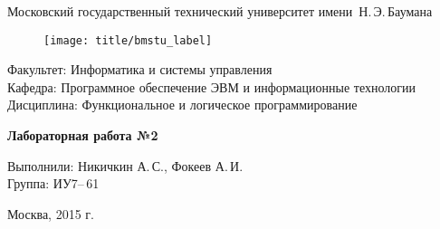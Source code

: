 
\thispagestyle{empty}

\begin{center}
	\Large
	Московский государственный технический университет имени~Н.\,Э.\,Баумана
\end{center}

\begin{figure}[h!]
	\begin{center}
		\texttt{[image: title/bmstu\_label]}
	\end{center}
\end{figure}

{\large
\noindent
Факультет: Информатика и системы управления\\[2mm]
\noindent
Кафедра: Программное обеспечение ЭВМ и информационные технологии\\[2mm]
\noindent
Дисциплина: Функциональное и логическое программирование
\vspace{1.5cm}}

\begin{center}
	\Large
	\textbf{Лабораторная работа №2}
\end{center}
\vfill

\hfill\begin{minipage}{0.5\textwidth}
	Выполнили: Никичкин А.\,С., Фокеев А.\,И.\\
	Группа: ИУ7--\,61
\end{minipage}
\vfill

\begin{center}
	Москва, 2015 г.
\end{center}